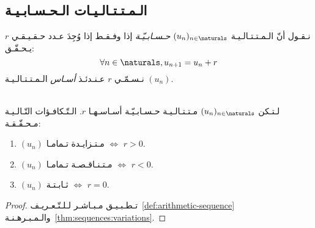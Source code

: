 \subsection{الـمـتـتـالـيـات الـحـسـابـيـة}%
\label{subsec:sequences:special:arithmetic}

\begin{definition}%
    \label{def:arithmetic-sequence}
    نـقـول أنّ الـمـتـتـالـيـة \((u_n)_{n \in \naturals}\) \emph{حـسـابـيّـة}
    إذا وفـقـط إذا وُجِدَ عـدد حـقـيـقـي \(r\) يـحـقّـق:
    \[\forall n \in \naturals, u_{n+1} = u_n + r\]
    نـسـمّـي \(r\) عـنـدئـذ \emph{أسـاس} الـمـتـتـالـيـة \((u_n)\).
\end{definition}

\begin{proposition}%
    \label{prop:arithmetic-sequence:variation}\ \\
    لـتـكن \((u_n)_{n \in \naturals}\) مـتـتـالـيـة حـسـابـيّـة أسـاسـهـا \(r\).
    الـتّـكافـؤات التّـالـيـة مـحـقّـقـة:
    \begin{enumerate}
        \item \((u_n)\) مـتـزايـدة تـمامـا \(\iff\) \(r > 0\).
        \item \((u_n)\) مـتـنـاقـصـة تـمامـا \(\iff\) \(r < 0\).
        \item \((u_n)\) ثـابـتـة \(\iff\) \(r = 0\).
    \end{enumerate}
\end{proposition}
\begin{proof}
    تـطـبـيـق مـبـاشـر لـلـتّـعـريـف~\ref{def:arithmetic-sequence}
    والـمـبـرهـنـة~\ref{thm:sequences:variations}.
\end{proof}
